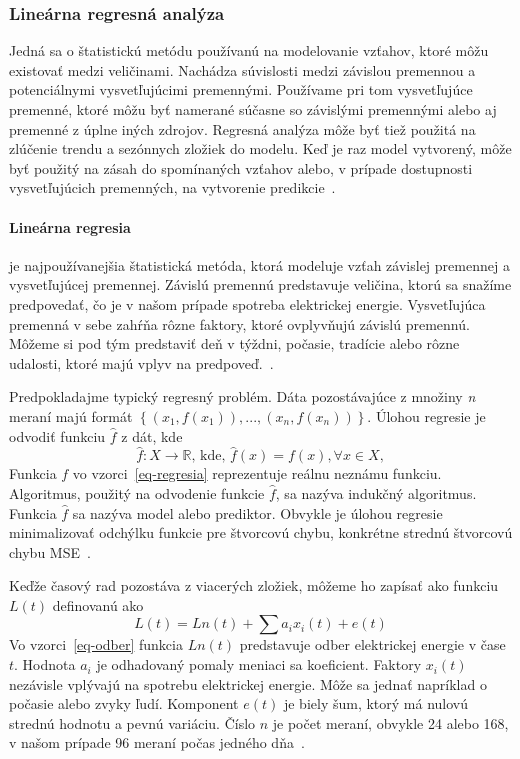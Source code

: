 \documentclass[a4paper,slovak,12pt,appendix]{article}
\begin{document}

\subsubsection{Lineárna regresná analýza}
Jedná sa o štatistickú metódu používanú na
modelovanie vzťahov, ktoré môžu existovať medzi veličinami. Nachádza súvislosti
medzi závislou premennou a potenciálnymi vysvetľujúcimi premennými. Používame
pri tom vysvetľujúce premenné, ktoré môžu byť namerané súčasne so závislými
premennými alebo aj premenné z úplne iných zdrojov. Regresná analýza môže byť
tiež použitá na zlúčenie trendu a sezónnych zložiek do modelu. Keď je raz model
vytvorený, môže byť použitý na zásah do spomínaných vzťahov alebo, v prípade
dostupnosti vysvetľujúcich premenných, na vytvorenie predikcie~\cite{Liu1992}.

\paragraph{Lineárna regresia} je najpoužívanejšia štatistická metóda, ktorá
modeluje vzťah závislej premennej
a vysvetľujúcej premennej. Závislú premennú predstavuje veličina, ktorú sa
snažíme predpovedať, čo je v našom prípade spotreba elektrickej energie.
Vysvetľujúca premenná v sebe zahŕňa rôzne faktory, ktoré ovplyvňujú závislú
premennú. Môžeme si pod tým predstaviť deň v týždni, počasie, tradície alebo rôzne
udalosti, ktoré majú vplyv na predpoveď.~\cite{KumarSingh2013, Mahalakshmi2016}.

Predpokladajme typický regresný problém. Dáta pozostávajúce z množiny \textit{n}
meraní majú formát $\left\{(x_1, f(x_1)), ..., (x_n, f(x_n))\right\}$.
Úlohou regresie je odvodiť funkciu $\hat{f}$ z dát, kde
\begin{equation}
  \hat{f} : X \to \mathbb{R} \text{, kde, } \hat{f}(x) = f(x), \forall x \in X,
  \label{eq-regresia}
\end{equation}
Funkcia $f$ vo vzorci~\ref{eq-regresia} reprezentuje reálnu neznámu
funkciu. Algoritmus, použitý na odvodenie funkcie $\hat{f}$, sa nazýva
indukčný algoritmus. Funkcia $\hat{f}$ sa nazýva model alebo
prediktor. Obvykle je úlohou regresie minimalizovať odchýlku funkcie pre
štvorcovú chybu, konkrétne strednú štvorcovú chybu MSE~\cite{Mendes-Moreira2012}.

Keďže časový rad pozostáva z viacerých zložiek, môžeme ho zapísať ako funkciu
$L(t)$ definovanú ako
\begin{equation}
  L(t) = Ln(t) + \sum a_i x_i(t) + e(t)
  \label{eq-odber}
\end{equation}
Vo vzorci~\ref{eq-odber} funkcia $Ln(t)$ predstavuje odber elektrickej energie
v čase $t$. Hodnota $a_i$ je odhadovaný pomaly meniaci sa koeficient. Faktory
$x_i(t)$ nezávisle vplývajú na spotrebu elektrickej energie. Môže sa jednať
napríklad o počasie alebo zvyky ľudí. Komponent $e(t)$ je biely šum, ktorý má nulovú
strednú hodnotu a pevnú variáciu. Číslo $n$ je počet meraní, obvykle 24
alebo 168, v našom prípade 96 meraní počas jedného dňa~\cite{KumarSingh2013}.
\end{document}
